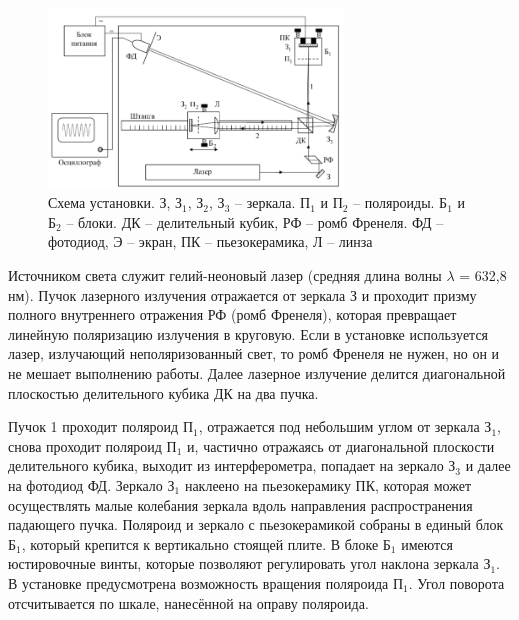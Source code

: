 \documentclass[a4paper]{article}
\begin{document}
\begin{figure}[ht!]
    \centering
    \includegraphics[width = 0.7\textwidth]{image/scheme.png}
    \caption{Схема установки. З, З$_1$, З$_2$, З$_3$ -- зеркала. П$_1$ и П$_2$ -- поляроиды. Б$_1$ и Б$_2$ -- блоки. ДК -- делительный кубик, РФ -- ромб Френеля. ФД -- фотодиод, Э -- экран, ПК -- пьезокерамика, Л -- линза}
\end{figure}

Источником света служит гелий-неоновый лазер (средняя длина волны $\lambda$ = 632,8 нм). Пучок лазерного излучения отражается от зеркала З и проходит призму полного внутреннего отражения РФ (ромб Френеля), которая превращает линейную поляризацию излучения в круговую. Если в установке используется лазер, излучающий неполяризованный свет, то ромб Френеля не нужен, но он и не мешает выполнению работы.
Далее лазерное излучение делится диагональной плоскостью делительного кубика ДК на два пучка.

Пучок 1 проходит поляроид П$_1$, отражается под небольшим углом от зеркала З$_1$, снова проходит поляроид П$_1$ и, частично отражаясь от диагональной плоскости делительного кубика, выходит из интерферометра, попадает на зеркало З$_3$ и далее на фотодиод ФД. Зеркало З$_1$ наклеено на пьезокерамику ПК, которая может осуществлять малые колебания зеркала вдоль направления распространения падающего пучка. Поляроид и зеркало с пьезокерамикой собраны в единый блок Б$_1$, который крепится к вертикально стоящей плите. В блоке Б$_1$ имеются юстировочные винты, которые позволяют регулировать угол наклона зеркала З$_1$. В установке предусмотрена возможность вращения поляроида П$_1$. Угол поворота отсчитывается по шкале, нанесённой на оправу
поляроида.
\end{document}
